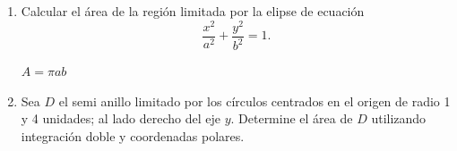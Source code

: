 \documentclass[a4,11pt]{aleph-examen}
\begin{document}
\begin{preguntas}
\begin{respuesta}
\begin{respuesta}
\begin{respuesta}
\begin{enumerate}
\begin{respuesta}
\end{respuesta}

\item
	Calcular el área de la región limitada por la elipse de ecuación
    \[
        \dfrac{x^2}{a^2}+\dfrac{y^2}{b^2}=1.
    \]
    
\begin{respuesta}
    $A=\pi ab$ %
\end{respuesta} 

\item 
    Sea $D$ el semi anillo limitado por los círculos centrados en el origen de radio 1 y 4 unidades; al lado derecho del eje $y$. Determine el área de $D$ utilizando integración doble y coordenadas polares.


\end{enumerate}
\end{respuesta}
\end{respuesta}
\end{respuesta}
\end{preguntas}
\end{document}
